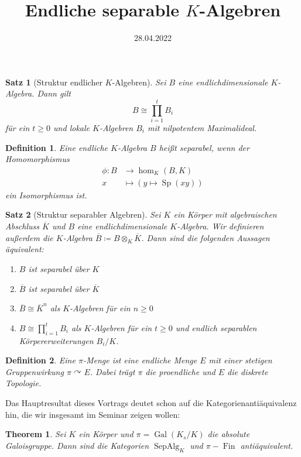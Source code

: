 \documentclass{article}
\title{Endliche separable $K$-Algebren}
\author{}
\date{\vspace*{-1cm}28.04.2022}
\newtheorem*{satz}{Satz}
\newtheorem*{theorem}{Theorem}
\newtheorem*{definition}{Definition}
\begin{document}
    \maketitle
    \begin{satz}[Struktur endlicher $K$-Algebren]
        Sei $B$ eine endlichdimensionale $K$-Algebra. Dann gilt
        \[
            B \cong \prod_{i=1}^t B_i
        \]
        für ein $t \geq 0$ und lokale $K$-Algebren $B_i$ mit nilpotentem Maximalideal.
    \end{satz}
    \begin{definition}
        Eine endliche $K$-Algebra $B$ heißt separabel, wenn der Homomorphismus
        \begin{align*}
            \phi\colon B &\to \hom_K(B, K)\\
            x &\mapsto (y \mapsto \operatorname{Sp}(xy))
        \end{align*}
        ein Isomorphismus ist.
    \end{definition}
    \begin{satz}[Struktur separabler Algebren]
        Sei $K$ ein Körper mit algebraischen Abschluss $\overline{K}$ und $B$ eine endlichdimensionale $K$-Algebra.
        Wir definieren außerdem die $K$-Algebra $\overline B \coloneqq B \otimes_K \overline K$.
        Dann sind die folgenden Aussagen äquivalent:
        \begin{enumerate}
            \item $B$ ist separabel über $K$
            \item $\overline{B}$ ist separabel über $\overline{K}$
            \item $\overline{B} \cong \overline{K}^n$ als $K$-Algebren für ein $n \geq 0$
            \item $B \cong \prod_{i=1}^t B_i$ als $K$-Algebren für ein $t \geq 0$ und endlich separablen Körpererweiterungen $B_i/K$.
        \end{enumerate}
    \end{satz}
    \begin{definition}
        Eine $\pi$-Menge ist eine endliche Menge $E$ mit einer stetigen Gruppenwirkung $\pi \curvearrowright E$.
        Dabei trägt $\pi$ die proendliche und $E$ die diskrete Topologie. 
    \end{definition}
    Das Hauptresultat dieses Vortrags deutet schon auf die Kategorienantiäquivalenz hin, die wir insgesamt im Seminar zeigen wollen:
    \begin{theorem}
        Sei $K$ ein Körper und $\pi = \operatorname{Gal}(K_s/K)$ die absolute Galoisgruppe. Dann sind die Kategorien $\operatorname{SepAlg}_K$ und $\pi-\operatorname{Fin}$ antiäquivalent.
    \end{theorem}
\end{document}
